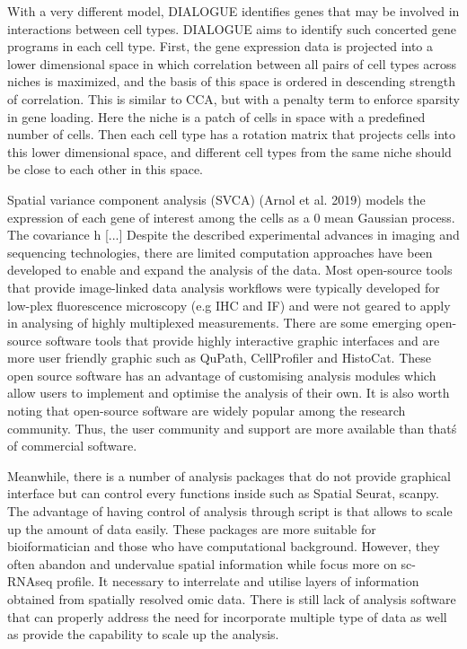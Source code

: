 With a very different model, DIALOGUE identifies genes that may be involved in interactions between cell types. DIALOGUE aims to identify such concerted gene programs in each cell type. First, the gene expression data is projected into a lower dimensional space in which correlation between all pairs of cell types across niches is maximized, and the basis of this space is ordered in descending strength of correlation. This is similar to CCA, but with a penalty term to enforce sparsity in gene loading. Here the niche is a patch of cells in space with a predefined number of cells. Then each cell type has a rotation matrix that projects cells into this lower dimensional space, and different cell types from the same niche should be close to each other in this space.

Spatial variance component analysis (SVCA) (Arnol et al. 2019) models the expression of each gene of interest among the cells as a 0 mean Gaussian process. The covariance h
[...]
Despite the described experimental advances in imaging and sequencing technologies, there are limited computation approaches have been developed to enable and expand the analysis of the data. Most open-source tools that provide image-linked data analysis workflows were typically developed for low-plex fluorescence microscopy (e.g IHC and IF) and were not geared to apply in analysing of highly multiplexed measurements. There are some emerging open-source software tools that provide highly interactive graphic interfaces and are more user friendly graphic such as QuPath, CellProfiler and HistoCat. These open source software has an advantage of customising analysis modules which allow users to implement and optimise the analysis of their own. It is also worth noting that open-source software are widely popular among the research community. Thus, the user community and support are more available  than that\'s of commercial software. 

Meanwhile, there is a number of analysis packages that do not provide graphical interface but can control every functions inside such as Spatial Seurat, scanpy. The advantage of having control of analysis through script is that allows to scale up the amount of data easily. These packages are more suitable for bioiformatician and those who have computational background. However, they often abandon and undervalue spatial information while focus more on sc-RNAseq profile. It necessary to interrelate and utilise layers of information obtained from spatially resolved omic data. There is still lack of analysis software that can properly address the need for incorporate multiple type of data as well as provide the capability to scale up the analysis.


